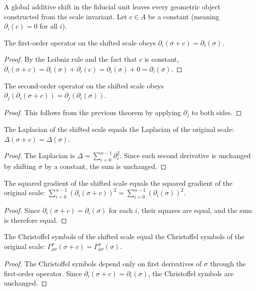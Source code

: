 A global additive shift in the fiducial unit leaves every geometric object constructed from the scale invariant. Let $c \in A$ be a constant (meaning $\partial_i(c) = 0$ for all $i$).

\begin{theorem}
The first-order operator on the shifted scale obeys $\partial_i(\sigma + c) = \partial_i(\sigma)$.
\end{theorem}
\begin{proof}
By the Leibniz rule and the fact that $c$ is constant, $\partial_i(\sigma + c) = \partial_i(\sigma) + \partial_i(c) = \partial_i(\sigma) + 0 = \partial_i(\sigma)$.
\end{proof}

\begin{theorem}
The second-order operator on the shifted scale obeys $\partial_j(\partial_i(\sigma + c)) = \partial_j(\partial_i(\sigma))$.
\end{theorem}
\begin{proof}
This follows from the previous theorem by applying $\partial_j$ to both sides.
\end{proof}

\begin{theorem}
The Laplacian of the shifted scale equals the Laplacian of the original scale: $\Delta(\sigma + c) = \Delta(\sigma)$.
\end{theorem}
\begin{proof}
The Laplacian is $\Delta = \sum_{i=0}^{n-1} \partial_i^2$. Since each second derivative is unchanged by shifting $\sigma$ by a constant, the sum is unchanged.
\end{proof}

\begin{theorem}
The squared gradient of the shifted scale equals the squared gradient of the original scale: $\sum_{i=0}^{n-1} (\partial_i(\sigma + c))^2 = \sum_{i=0}^{n-1} (\partial_i(\sigma))^2$.
\end{theorem}
\begin{proof}
Since $\partial_i(\sigma + c) = \partial_i(\sigma)$ for each $i$, their squares are equal, and the sum is therefore equal.
\end{proof}

\begin{theorem}
The Christoffel symbols of the shifted scale equal the Christoffel symbols of the original scale: $\Gamma^\rho_{\mu\nu}(\sigma + c) = \Gamma^\rho_{\mu\nu}(\sigma)$.
\end{theorem}
\begin{proof}
The Christoffel symbols depend only on first derivatives of $\sigma$ through the first-order operator. Since $\partial_i(\sigma + c) = \partial_i(\sigma)$, the Christoffel symbols are unchanged.
\end{proof}

